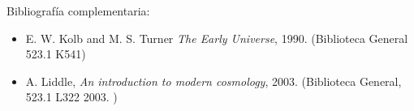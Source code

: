 \documentclass[letterpaper,10pt,onecolumn]{article}
\begin{document}
\noindent\normalsize Bibliograf\'ia complementaria:

\begin{itemize}
\item E. W. Kolb and M. S. Turner \textit{The Early Universe},
  1990. (Biblioteca General  523.1 K541)\\[-0.6cm]
\item A. Liddle, \textit{An introduction to modern cosmology}, 2003.
  (Biblioteca General, 523.1 L322 2003. )\\[-0.2cm] 
\end{itemize}
\end{document}
